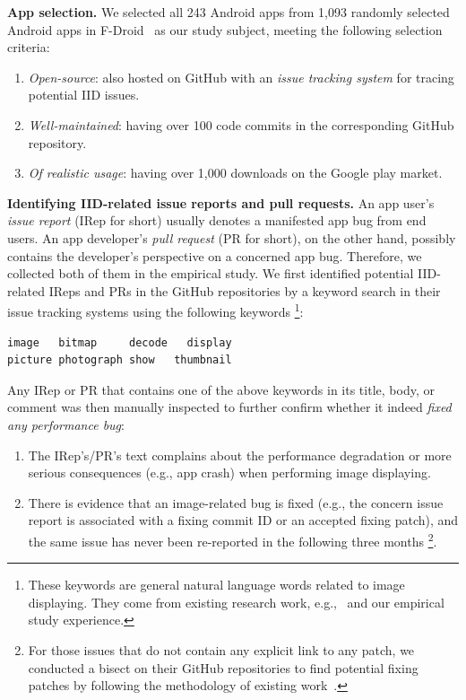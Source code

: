 \noindent\textbf{App selection.} We selected all 243 Android apps from 1,093 randomly selected Android apps in F-Droid~\cite{f-droid} as our study subject, meeting the following selection criteria:

\begin{enumerate}
	\item \emph{Open-source}: also hosted on GitHub with an \emph{issue tracking system} for tracing potential IID issues.
	\item \emph{Well-maintained}: having over 100 code commits in the corresponding GitHub repository.
	\item \emph{Of realistic usage}: having over 1,000 downloads on the Google play market.
\end{enumerate}

\medskip

\noindent\textbf{Identifying IID-related issue reports and pull requests.}
An app user's \emph{issue report} (IRep for short) usually denotes a manifested app bug from end users.
An app developer's \emph{pull request} (PR for short), on the other hand, possibly contains the developer's perspective on a concerned app bug. Therefore, we collected both of them in the empirical study.
We first identified potential IID-related IReps and PRs in the GitHub repositories by a keyword search in their issue tracking systems using the following keywords%
\footnote{These keywords are general natural language words related to image displaying. They come from existing research work, e.g.,~\cite{linares2015developers, wang2016profiling} and our empirical study experience.}:

\begin{Verbatim}[fontsize=\small]
image   bitmap     decode   display
picture photograph show   thumbnail
\end{Verbatim}

Any IRep or PR that contains one of the above keywords in its title, body, or comment was then manually inspected to further confirm whether it indeed \emph{fixed any performance bug}:

\begin{enumerate}
  \item The IRep's/PR's text complains about the performance degradation or more serious consequences (e.g., app crash) when performing image displaying.
  \item There is evidence that an image-related bug is fixed (e.g., the concern issue report is associated with a fixing commit ID or an accepted fixing patch), and the same issue has never been re-reported in the following three months%
  \footnote{For those issues that do not contain any explicit link to any patch, we conducted a bisect on their GitHub repositories to find potential fixing patches by following the methodology of existing work~\cite{traceability}.}.
\end{enumerate}

